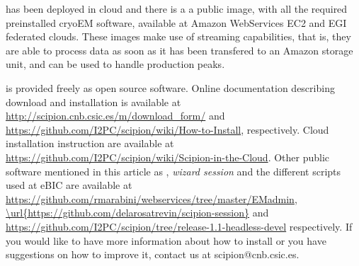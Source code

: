  \scipion has been deployed in cloud and there is a  a public image, with all the required preinstalled cryoEM software,  available at Amazon WebServices EC2 and EGI federated clouds. These images make use of \scipion streaming capabilities, that is, they are able to process data as soon as it has been transfered to an Amazon storage unit, and can be used to handle  production peaks.
 
 
\scipion is provided 
freely as open source software. Online documentation
describing \scipion download and installation is available
at \url{http://scipion.cnb.csic.es/m/download_form/} and \url{https://github.com/I2PC/scipion/wiki/How-to-Install}, respectively. Cloud installation instruction are available at \url{https://github.com/I2PC/scipion/wiki/Scipion-in-the-Cloud}. Other public software mentioned in this article as \emadmin, \emph{wizard session} and the different scripts used at eBIC are available at \url{https://github.com/rmarabini/webservices/tree/master/EMadmin}, \url{\url{https://github.com/delarosatrevin/scipion-session}} and \url{https://github.com/I2PC/scipion/tree/release-1.1-headless-devel} respectively.
If you would like to have more information about how to install \scipion or you have suggestions on how to improve it, contact us at scipion@cnb.csic.es.






